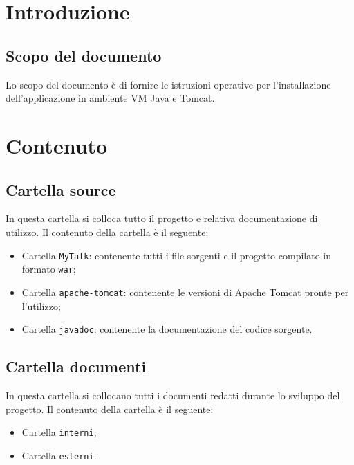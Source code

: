 \section{Introduzione}{

	\subsection{Scopo del documento}{
Lo scopo del documento è di fornire le istruzioni operative per l'installazione dell'applicazione \textbf{\mytalk} in ambiente VM Java e Tomcat.	
	}
}

\section{Contenuto}{
	\subsection{Cartella source}{
In questa cartella si colloca tutto il progetto e relativa documentazione di utilizzo.  Il contenuto della cartella è il seguente:
\begin{itemize}
	\item Cartella \texttt{MyTalk}: contenente tutti i file sorgenti e il progetto compilato in formato \texttt{war};
	\item Cartella \texttt{apache-tomcat}: contenente le versioni di Apache Tomcat pronte per l'utilizzo;
	\item Cartella \texttt{javadoc}: contenente la documentazione del codice sorgente.	
\end{itemize}

	}
	
	\subsection{Cartella documenti}{
In questa cartella si collocano tutti i documenti redatti durante lo sviluppo del progetto. Il contenuto della cartella è il seguente:
\begin{itemize}
	\item Cartella \texttt{interni};
	\item Cartella \texttt{esterni}.
\end{itemize}

	}
}